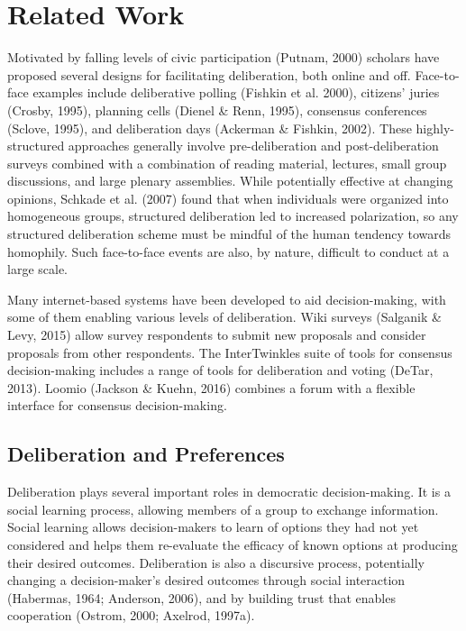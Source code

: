 \section{Related Work}
Motivated by falling levels of civic participation (Putnam, 2000) scholars have proposed several designs for facilitating deliberation, both online and off. Face-to-face examples include deliberative polling (Fishkin et al. 2000), citizens’ juries (Crosby, 1995), planning cells (Dienel \& Renn, 1995), consensus conferences (Sclove, 1995), and deliberation days (Ackerman \& Fishkin, 2002). These highly-structured approaches generally involve pre-deliberation and post-deliberation surveys combined with a combination of reading material, lectures, small group discussions, and large plenary assemblies. While potentially effective at changing opinions, Schkade et al. (2007) found that when individuals were organized into homogeneous groups, structured deliberation led to increased polarization, so any structured deliberation scheme must be mindful of the human tendency towards homophily. Such face-to-face events are also, by nature, difficult to conduct at a large scale. 

Many internet-based systems have been developed to aid decision-making, with some of them enabling various levels of deliberation. Wiki surveys (Salganik \& Levy, 2015) allow survey respondents to submit new proposals and consider proposals from other respondents. The InterTwinkles suite of tools for consensus decision-making includes a range of tools for deliberation and voting (DeTar, 2013). Loomio (Jackson \& Kuehn, 2016) combines a forum with a flexible interface for consensus decision-making.

\subsection{Deliberation and Preferences}
Deliberation plays several important roles in democratic decision-making. It is a social learning process, allowing members of a group to exchange information. Social learning allows decision-makers to learn of options they had not yet considered and helps them re-evaluate the efficacy of known options at producing their desired outcomes. Deliberation is also a discursive process, potentially changing a decision-maker’s desired outcomes through social interaction (Habermas, 1964; Anderson, 2006), and by building trust that enables cooperation (Ostrom, 2000; Axelrod, 1997a).

